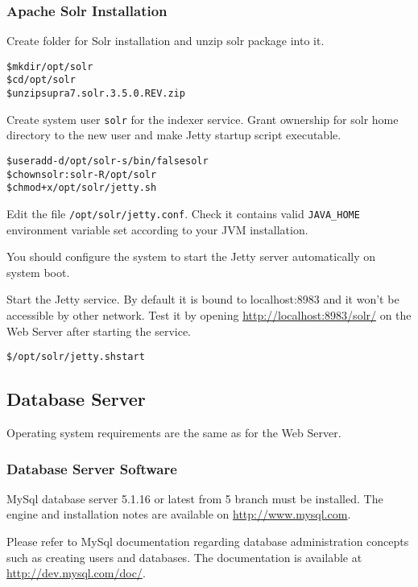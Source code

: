 \documentclass[12pt]{article}
\newcommand{\vigPackageSolr}{supra7.solr.3.5.0.REV.zip}
\begin{document}
\subsubsection{Apache Solr Installation\label{solrInstallation}}

Create folder for Solr installation and unzip solr package into it.

\begin{alltt}
\$ mkdir /opt/solr
\$ cd /opt/solr
\$ unzip \vigPackageSolr
\end{alltt}

Create system user \texttt{solr} for the indexer service. Grant ownership for solr home directory to the new user and make Jetty startup script executable.

\begin{alltt}
\$ useradd -d /opt/solr -s /bin/false solr
\$ chown solr:solr -R /opt/solr
\$ chmod +x /opt/solr/jetty.sh
\end{alltt}

Edit the file \texttt{/opt/solr/jetty.conf}. Check it contains valid \texttt{JAVA\_HOME} environment variable set according to your JVM installation.

You should configure the system to start the Jetty server automatically on system boot.

Start the Jetty service. By default it is bound to localhost:8983 and it won't be accessible by other network. Test it by opening \url{http://localhost:8983/solr/} on the Web Server after starting the service.

\begin{alltt}
\$ /opt/solr/jetty.sh start
\end{alltt}

\subsection{Database Server}
Operating system requirements are the same as for the Web Server.

\subsubsection{Database Server Software}

MySql database server 5.1.16 or latest from 5 branch must be installed. The engine and installation notes are available on \url{http://www.mysql.com}.

Please refer to MySql documentation regarding database administration concepts such as creating users and databases. The documentation is available at \url{http://dev.mysql.com/doc/}.
\end{document}
